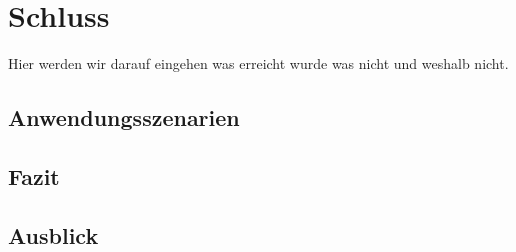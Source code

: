 \section{Schluss}
Hier werden wir darauf eingehen was erreicht wurde was nicht und weshalb nicht.
\subsection{Anwendungsszenarien}
\subsection{Fazit}

\subsection{Ausblick}
